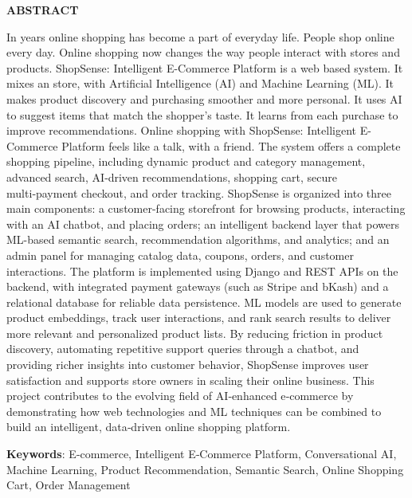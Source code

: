 \thispagestyle{plain}
\begin{center}
    \Large \textbf{\textcolor{GUBGreen}{ABSTRACT}}
\end{center}
\vspace{3\baselineskip}
\noindent
In years online shopping has become a part of everyday life. People shop online every day. Online shopping now changes the way people interact with stores and products. ShopSense: Intelligent E-Commerce Platform is a web based system. It mixes an store, with Artificial Intelligence (AI) and Machine Learning (ML). It makes product discovery and purchasing smoother and more personal. It uses AI to suggest items that match the shopper’s taste. It learns from each purchase to improve recommendations. Online shopping with ShopSense: Intelligent E-Commerce Platform feels like a talk, with a friend. The system offers a complete shopping pipeline, including dynamic product and category management, advanced search, AI‑driven recommendations, shopping cart, secure multi‑payment checkout, and order tracking. ShopSense is organized into three main components: a customer-facing storefront for browsing products, interacting with an AI chatbot, and placing orders; an intelligent backend layer that powers ML-based semantic search, recommendation algorithms, and analytics; and an admin panel for managing catalog data, coupons, orders, and customer interactions. The platform is implemented using Django and REST APIs on the backend, with integrated payment gateways (such as Stripe and bKash) and a relational database for reliable data persistence. ML models are used to generate product embeddings, track user interactions, and rank search results to deliver more relevant and personalized product lists. By reducing friction in product discovery, automating repetitive support queries through a chatbot, and providing richer insights into customer behavior, ShopSense improves user satisfaction and supports store owners in scaling their online business. This project contributes to the evolving field of AI‑enhanced e‑commerce by demonstrating how web technologies and ML techniques can be combined to build an intelligent, data‑driven online shopping platform.


\vspace{\baselineskip}
\noindent
\textbf{Keywords}: E‑commerce, Intelligent E‑Commerce Platform, Conversational AI, Machine Learning, Product Recommendation, Semantic Search, Online Shopping Cart, Order Management




